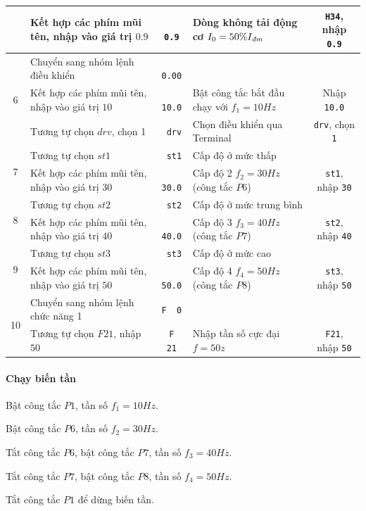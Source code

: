 \documentclass[13pt,a4paper]{extarticle}
\begin{document}
\begin{center}
\begin{longtable}{|c|p{5cm}|c|p{5cm}|c|}
  & Kết hợp các phím mũi tên, nhập vào giá trị $0.9$ & \verb|  0.9| & Dòng không tải động cơ $I_0 = 50\%I_{\text{\textit{đm}}}$ &  \verb|H34|, nhập \verb|0.9| \\ \hline
\multirow{3}{.6cm}{6} & Chuyển sang nhóm lệnh điều khiển & \verb| 0.00| &  &  \\ \cline{2-5}     
  & Kết hợp các phím mũi tên, nhập vào giá trị $10$ & \verb| 10.0| & Bật công tắc bắt đầu chạy với $f_1 = 10Hz$ & Nhập \verb|10.0| \\ \cline{2-5}
  & Tương tự chọn $drv$, chọn 1 & \verb| drv| & Chọn điều khiển qua Terminal &  \verb|drv|, chọn \verb|1|\\ \hline     
\multirow{2}{.6cm}{7} & Tương tự chọn $st1$ & \verb| st1| & Cấp độ ở mức thấp &  \\ \cline{2-5}   
  & Kết hợp các phím mũi tên, nhập vào giá trị $30$ & \verb| 30.0| & Cấp độ 2 $f_2 = 30Hz$ (công tắc $P6$) &  \verb|st1|, nhập \verb|30| \\ \hline
\multirow{2}{.6cm}{8} & Tương tự chọn $st2$ & \verb| st2| & Cấp độ ở mức trung bình &  \\ \cline{2-5}   
  & Kết hợp các phím mũi tên, nhập vào giá trị $40$ & \verb| 40.0| & Cấp độ 3 $f_3 = 40Hz$ (công tắc $P7$) &  \verb|st2|, nhập \verb|40| \\ \hline
\multirow{2}{.6cm}{9} & Tương tự chọn $st3$ & \verb| st3| & Cấp độ ở mức cao &  \\ \cline{2-5}    
  & Kết hợp các phím mũi tên, nhập vào giá trị $50$ & \verb| 50.0| & Cấp độ 4 $f_4 = 50Hz$ (công tắc $P8$) &  \verb|st3|, nhập \verb|50| \\ \hline
\multirow{2}{.6cm}{10} & Chuyển sang nhóm lệnh chức năng 1 & \verb|F  0| &  &  \\ \cline{2-5}    
  & Tương tự chọn $F21$, nhập $50$ & \verb|F  21| & Nhập tần số cực đại $f = 50z$ &  \verb|F21|, nhập \verb|50|\\ \hline     
\end{longtable}
\end{center}
\paragraph{Chạy biến tần}
\begin{list}{--}{}
\item Bật công tắc $P1$, tần số $f_1 = 10Hz$.
\item Bật công tắc $P6$, tần số $f_2 = 30Hz$.
\item Tắt công tắc $P6$, bật công tắc $P7$, tần số $f_3 = 40Hz$.
\item Tắt công tắc $P7$, bật công tắc $P8$, tần số $f_4 = 50Hz$.
\item Tắt công tắc $P1$ để dừng biến tần.
\end{list}
\newpage
\end{document}
